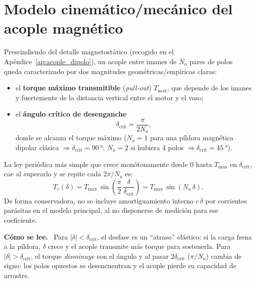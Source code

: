 \documentclass[11pt,a4paper,oneside]{report}
\theoremstyle{definition}
\theoremstyle{remark}
\newenvironment{lectura}%
  {\par\smallskip\noindent\textbf{Cómo se lee.}\ }%
  {\par\smallskip}
\begin{document}
\section{Modelo cinemático/mecánico del acople magnético}\label{cap:acople}
Prescindiendo del detalle magnetostático (recogido en el
Apéndice~\ref{ap:acople_dipolo}), un acople entre imanes de $N_a$ pares de polos
queda caracterizado por dos magnitudes geométricas/empíricas claras:
\begin{itemize}
  \item el \textbf{torque máximo transmitible} (\emph{pull-out}) $T_{\max}$,
        que depende de los imanes y fuertemente de la distancia vertical entre
        el motor y el vaso;
  \item el \textbf{ángulo crítico de desenganche}
        \begin{equation}
          \delta_{\text{crit}} = \frac{\pi}{2 N_a},
        \end{equation}
        donde se alcanza el torque máximo ($N_a=1$ para una píldora magnética
        dipolar clásica $\Rightarrow \delta_{\text{crit}}=\SI{90}{\degree}$;
        $N_a=2$ si hubiera 4 polos $\Rightarrow \delta_{\text{crit}}=\SI{45}{\degree}$).
\end{itemize}
La ley periódica más simple que crece monótonamente desde $0$ hasta $T_{\max}$
en $\delta_{\text{crit}}$, cae al superarlo y se repite cada $2\pi/N_a$ es:
\begin{equation}
  \boxed{\;T_c(\delta) = T_{\max}\,\sin\!\left(\frac{\pi}{2}\,\frac{\delta}{\delta_{\text{crit}}}\right)
                       = T_{\max}\,\sin(N_a\,\delta).\;}
  \label{eq:acople}
\end{equation}
De forma conservadora, no se incluye amortiguamiento interno $c\,\dot\delta$ por
corrientes parásitas en el modelo principal, al no disponerse de medición para
ese coeficiente.

\begin{lectura}
Para $|\delta| < \delta_{\text{crit}}$, el desfase es un ``atraso'' elástico: si
la carga frena a la píldora, $\delta$ crece y el acople transmite más torque
para sostenerla. Para $|\delta| > \delta_{\text{crit}}$, el torque
\emph{disminuye} con el ángulo y al pasar $2\delta_{\text{crit}}$ ($\pi/N_a$)
cambia de signo: los polos opuestos se desencuentran y el acople pierde su
capacidad de arrastre.
\end{lectura}
\end{document}
